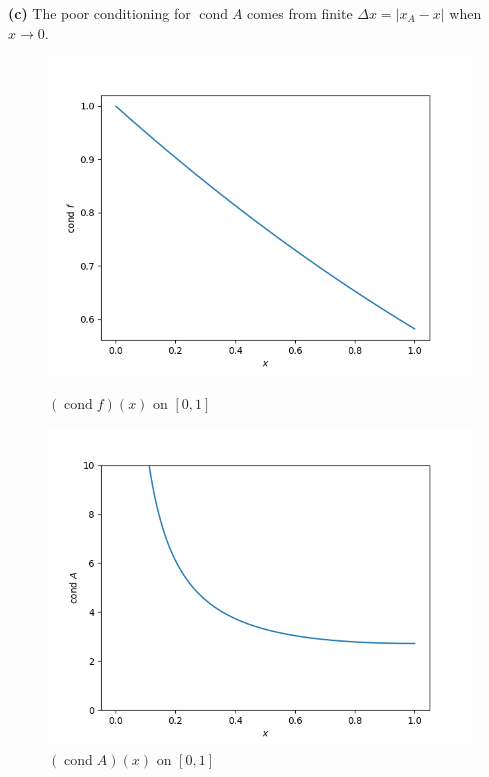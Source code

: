 \documentclass[11pt]{article}
\numberwithin{equation}{section} %
\DeclareMathOperator{\cond}{cond}
\begin{document}
\textbf{(c)} The poor conditioning for $\cond A$ comes from finite 
$\Delta x = |x_A - x|$ when $x\to 0$. 
\begin{figure}[!htp]
  \begin{minipage}[b]{0.5\linewidth}
    \centering
    \includegraphics[width=\linewidth]{condf.png}
    \caption{$(\cond f)(x)$ on $[0, 1]$}
  \end{minipage}%
  \begin{minipage}[b]{0.5\linewidth}
    \centering
    \includegraphics[width=\linewidth]{conda.png}
    \caption{$(\cond A)(x)$ on $[0, 1]$}
  \end{minipage}
\end{figure}
\end{document}
